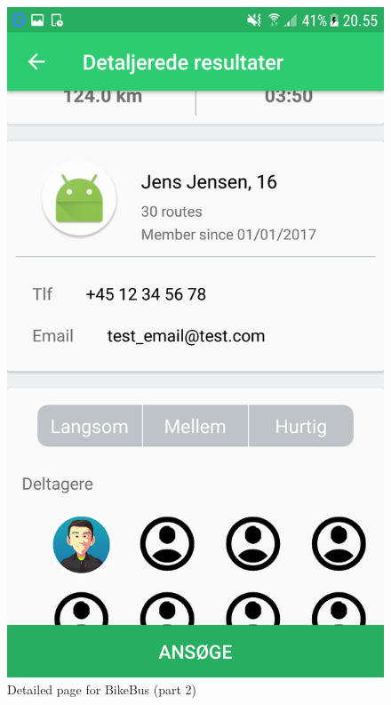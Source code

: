 \begin{figure}[!htb]
\begin{minipage}{0.32\textwidth}
    \includegraphics[width=\linewidth]{Graphics/Images/bikebus_detail_2.png}
    \caption{Detailed page for BikeBus (part 2)}
    \label{fig:sample_figure}
\end{minipage}
\end{figure}